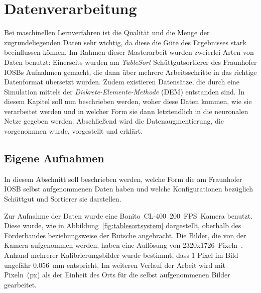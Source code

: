 \chapter{Datenverarbeitung}

Bei maschinellen Lernverfahren ist die Qualität und die Menge der zugrundeliegenden Daten sehr wichtig,
da diese die Güte des Ergebnisses stark beeinflussen können.
Im Rahmen dieser Masterarbeit wurden zweierlei Arten von Daten benutzt:
Einerseits wurden am \textit{TableSort} Schüttgutsortierer des Fraunhofer IOSBs Aufnahmen gemacht, 
die dann über mehrere Arbeitsschritte in das richtige Datenformat übersetzt wurden.
Zudem existieren Datensätze, die durch eine Simulation mittels der \textit{Diskrete-Elemente-Methode} (DEM) entstanden sind. 
In diesem Kapitel soll nun beschrieben werden, woher diese Daten kommen, wie sie verarbeitet werden 
und in welcher Form sie dann letztendlich in die neuronalen Netze gegeben werden.
Abschließend wird die Datenaugmentierung, die vorgenommen wurde, vorgestellt und erklärt.





\section{Eigene Aufnahmen}

In diesem Abschnitt soll beschrieben werden, welche Form die am Fraunhofer IOSB selbst aufgenommenen Daten haben und welche Konfigurationen bezüglich Schüttgut und Sortierer sie darstellen.





Zur Aufnahme der Daten wurde eine Bonito~CL-400~200~FPS~Kamera benutzt. 
Diese wurde, wie in Abbildung~\ref{fig:tablesortsystem} dargestellt, oberhalb des Förderbandes beziehungsweise der Rutsche angebracht.
Die Bilder, die von der Kamera aufgenommen werden, haben eine Auflösung von 2320x1726~Pixeln~\cite{alliedvisiontechnologiesgmbh2014}.
Anhand mehrerer Kalibrierungsbilder wurde bestimmt, dass 1 Pixel im Bild ungefähr \SI{0.056}{\milli\meter} entspricht.
Im weiteren Verlauf der Arbeit wird mit Pixeln~(px) als der Einheit des Orts für die selbst aufgenommenen Bilder gearbeitet.

